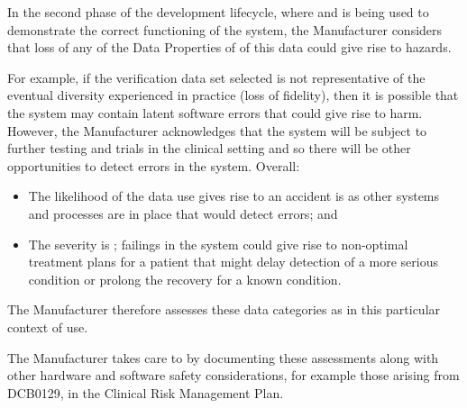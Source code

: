 In the second phase of the development lifecycle, where  and  is being used to demonstrate the correct functioning of the system, the Manufacturer considers that loss of any of the Data Properties of  of this data could give rise to hazards.

For example, if the verification data set selected is not representative of the eventual diversity experienced in practice (loss of \gls{fidelity}), then it is possible that the system may contain latent software errors that could give rise to harm. However, the Manufacturer acknowledges that the system will be subject to further testing and trials in the clinical setting and so there will be other opportunities to detect errors in the system. Overall:
\begin{itemize}
  \item The likelihood of the data use gives rise to an accident is  as other systems and processes are in place that would detect errors; and
  \item The severity is ; failings in the system could give rise to non-optimal treatment plans for a patient that might delay detection of a more serious condition or prolong the recovery for a known condition.
\end{itemize}

The Manufacturer therefore assesses these data categories as  in this particular context of use.

The Manufacturer takes care to  by documenting these assessments along with other hardware and software safety considerations, for example those arising from
DCB0129,
in the Clinical Risk Management Plan.

